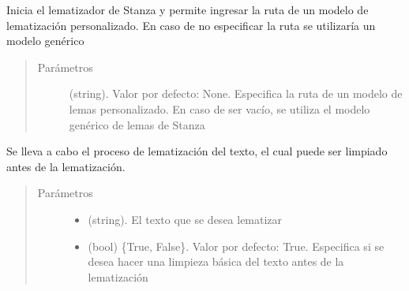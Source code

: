 \documentclass[letterpaper,10pt,openany,spanish]{sphinxmanual}
\begin{document}
\begin{fulllineitems}
\begin{fulllineitems}
\label{\detokenize{funciones/lematizacion:lematizacion.LematizadorStanza.iniciar_lematizador}}
Inicia el lematizador de Stanza y permite ingresar la ruta de un modelo             de lematización personalizado. En caso de no especificar la ruta             se utilizaría un modelo genérico
\begin{quote}\begin{description}
\item[{Parámetros}] \leavevmode
{} \textendash{} (string). Valor por defecto: None. Especifica la ruta             de un modelo de lemas personalizado. En caso de ser vacío, se utiliza             el modelo genérico de lemas de Stanza

\end{description}\end{quote}

\end{fulllineitems}


\begin{fulllineitems}
\label{\detokenize{funciones/lematizacion:lematizacion.LematizadorStanza.lematizar}}
Se lleva a cabo el proceso de lematización del texto, el cual puede             ser limpiado antes de la lematización.
\begin{quote}\begin{description}
\item[{Parámetros}] \leavevmode\begin{itemize}
\item {} 
 \textendash{} (string). El texto que se desea lematizar

\item {} 
 \textendash{} (bool) \{True, False\}. Valor por defecto: True. Especifica             si se desea hacer una limpieza básica del texto antes de la lematización

\end{itemize}


\end{description}
\end{quote}
\end{fulllineitems}
\end{fulllineitems}
\end{document}
